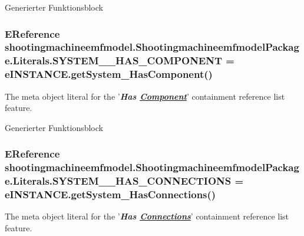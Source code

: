Generierter Funktionsblock \hypertarget{interfaceshootingmachineemfmodel_1_1_shootingmachineemfmodel_package_1_1_literals_a8a5d19bff1b5c893c01dde5a1b5f58da}{
\subsubsection[{S\-Y\-S\-T\-E\-M\-\_\-\-\_\-\-H\-A\-S\-\_\-\-C\-O\-M\-P\-O\-N\-E\-N\-T}]{\setlength{\rightskip}{0pt plus 5cm}E\-Reference shootingmachineemfmodel.\-Shootingmachineemfmodel\-Package.\-Literals.\-S\-Y\-S\-T\-E\-M\-\_\-\-\_\-\-H\-A\-S\-\_\-\-C\-O\-M\-P\-O\-N\-E\-N\-T = e\-I\-N\-S\-T\-A\-N\-C\-E.\-get\-System\-\_\-\-Has\-Component()}}\label{interfaceshootingmachineemfmodel_1_1_shootingmachineemfmodel_package_1_1_literals_a8a5d19bff1b5c893c01dde5a1b5f58da}
The meta object literal for the '{\itshape {\bfseries Has \hyperlink{interfaceshootingmachineemfmodel_1_1_component}{Component}}}' containment reference list feature.

Generierter Funktionsblock \hypertarget{interfaceshootingmachineemfmodel_1_1_shootingmachineemfmodel_package_1_1_literals_af9e8b9885c42be220e22482ed80c1cb7}{
\subsubsection[{S\-Y\-S\-T\-E\-M\-\_\-\-\_\-\-H\-A\-S\-\_\-\-C\-O\-N\-N\-E\-C\-T\-I\-O\-N\-S}]{\setlength{\rightskip}{0pt plus 5cm}E\-Reference shootingmachineemfmodel.\-Shootingmachineemfmodel\-Package.\-Literals.\-S\-Y\-S\-T\-E\-M\-\_\-\-\_\-\-H\-A\-S\-\_\-\-C\-O\-N\-N\-E\-C\-T\-I\-O\-N\-S = e\-I\-N\-S\-T\-A\-N\-C\-E.\-get\-System\-\_\-\-Has\-Connections()}}\label{interfaceshootingmachineemfmodel_1_1_shootingmachineemfmodel_package_1_1_literals_af9e8b9885c42be220e22482ed80c1cb7}
The meta object literal for the '{\itshape {\bfseries Has \hyperlink{interfaceshootingmachineemfmodel_1_1_connections}{Connections}}}' containment reference list feature.

